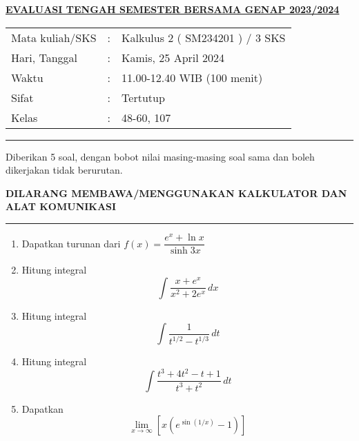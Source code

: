 \documentclass[11pt,openany,a4paper]{article}
\begin{document}
    \newpage

    \pagestyle{problems}

    \begin{center}
	{\underline{\textbf{\MakeUppercase{Evaluasi Tengah Semester Bersama Genap 2023/2024}}}}
    \end{center}

    \begin{center}
	\begin{tabular}{lcl}
		Mata kuliah/SKS & : & Kalkulus 2 ( SM234201 ) / 3 SKS\\
		Hari, Tanggal & : & Kamis, 25 April 2024\\
		Waktu & : & 11.00-12.40 WIB (100 menit)\\
		Sifat & : & Tertutup\\
		Kelas & : & 48-60, 107
	\end{tabular}
    \end{center}
	
    \noindent\rule{\textwidth}{2.pt}
	
    \setlength{\parindent}{5pt}
    \par Diberikan 5 soal, dengan bobot nilai masing-masing soal sama dan boleh dikerjakan tidak berurutan.
    \setlength{\parindent}{5pt}
    \setlength{\parindent}{5pt}
    {\small
    \par \textbf{\MakeUppercase{Dilarang membawa/menggunakan kalkulator dan alat komunikasi}}
    }
    \par {}
	
    \noindent\rule{\textwidth}{2.pt}
	
\begin{enumerate}
  \item Dapatkan turunan dari
  $
  f(x) = \dfrac{e^x + \ln x}{\sinh 3x}
  $

  \item Hitung integral
  \[
  \int \frac{x + e^x}{x^2 + 2e^x} \, dx
  \]

  \item Hitung integral
  \[
  \int \frac{1}{t^{1/2} - t^{1/3}} \, dt
  \]

  \item Hitung integral
  \[
  \int \frac{t^3 + 4t^2 - t + 1}{t^3 + t^2} \, dt
  \]

  \item Dapatkan
  \[
  \lim_{x \to \infty} \left[ x \left( e^{\sin(1/x)} - 1 \right) \right]
  \]
\end{enumerate}
	
\end{document}
